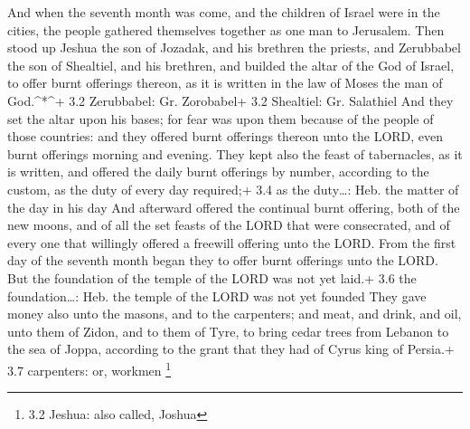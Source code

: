  And when the seventh month was come, and the children of
Israel were in the cities, the people gathered themselves together as
one man to Jerusalem.  Then stood up Jeshua the son of
Jozadak, and his brethren the priests, and Zerubbabel the son of
Shealtiel, and his brethren, and builded the altar of the God of Israel,
to offer burnt offerings thereon, as it is written in the law of Moses
the man of God.\^{}*\^{}+ 3.2 Zerubbabel: Gr. Zorobabel+ 3.2 Shealtiel:
Gr. Salathiel  And they set the altar upon his bases; for
fear was upon them because of the people of those countries: and they
offered burnt offerings thereon unto the LORD, even burnt offerings
morning and evening.  They kept also the feast of
tabernacles, as it is written, and offered the daily burnt offerings by
number, according to the custom, as the duty of every day required;+ 3.4
as the duty\ldots: Heb. the matter of the day in his day 
And afterward offered the continual burnt offering, both of the new
moons, and of all the set feasts of the LORD that were consecrated, and
of every one that willingly offered a freewill offering unto the LORD.
 From the first day of the seventh month began they to offer
burnt offerings unto the LORD. But the foundation of the temple of the
LORD was not yet laid.+ 3.6 the foundation\ldots: Heb. the temple of the
LORD was not yet founded  They gave money also unto the
masons, and to the carpenters; and meat, and drink, and oil, unto them
of Zidon, and to them of Tyre, to bring cedar trees from Lebanon to the
sea of Joppa, according to the grant that they had of Cyrus king of
Persia.+ 3.7 carpenters: or, workmen \footnote{3.2 Jeshua: also called,
  Joshua}

